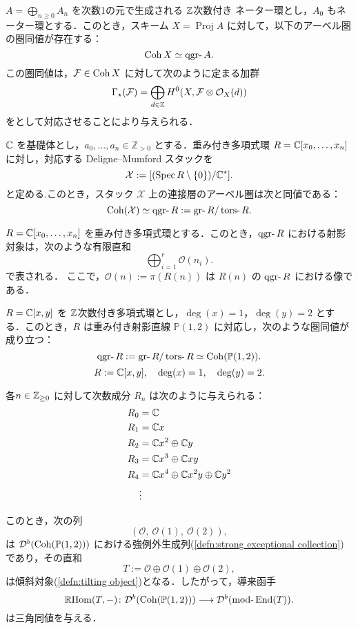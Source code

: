 \begin{thm}
\( A = \bigoplus_{n \ge 0} A_n \) を次数1の元で生成される \({\mathbb Z}\)次数付き ネーター環とし，\( A_0 \) もネーター環とする．このとき，スキーム \( X = \operatorname{Proj} A \) に対して，以下のアーベル圏の圏同値が存在する：
\[
\Coh X \simeq \qgr A.
\]
この圏同値は，\( {\mathcal F} \in \operatorname{\mathrm{Coh}} X \) に対して次のように定まる加群
\[
\Gamma_\star({\mathcal F}) = \bigoplus_{d \in {\mathbb Z}} H^0(X, {\mathcal F} \otimes \mathcal{O}_X(d))
\]
をとして対応させることにより与えられる．
\end{thm}

\begin{prop}\cite{GL87}
${\mathbb C}$ を基礎体とし，$a_0, \dots, a_n \in \mathbb{Z}_{>0}$ とする．重み付き多項式環 $R = {\mathbb C}[x_0, \dots, x_n]$ に対し，対応する Deligne–Mumford スタックを
\[
\mathcal{X} := [(\operatorname{\mathrm{Spec}} R \setminus \{0\}) / {\mathbb C}^*].
\]
と定める.このとき，スタック $\mathcal{X}$ 上の連接層のアーベル圏は次と同値である：
\[
\Coh(\mathcal{X}) \simeq \qgr R := \gr R / \tors R.
\]
\end{prop}



\begin{prop}[\cite{AZ94}]
$R = {\mathbb C}[x_0, \dots, x_n]$ を重み付き多項式環とする．このとき，$\qgr R$ における射影対象は，次のような有限直和
\[
\bigoplus_{i=1}^r \mathcal{O}(n_i).
\]
で表される．
ここで，$\mathcal{O}(n) := \pi(R(n))$ は $R(n)$ の $\qgr R$ における像である．
\end{prop}


\begin{exmp}
$R = {\mathbb C}[x, y]$ を ${\mathbb Z}$次数付き多項式環とし，$\deg(x) = 1$，$\deg(y) = 2$ とする．このとき，$R$ は重み付き射影直線 $\mathbb{P}(1,2)$ に対応し，次のような圏同値が成り立つ：
\[
\qgr R := \gr R / \tors R \simeq \Coh(\mathbb{P}(1,2)).
\]
\[
R := {\mathbb C}[x, y], \quad \deg(x) = 1,\quad \deg(y) = 2.
\]

各\(n \in {\mathbb Z}_{\ge 0}\) に対して次数成分 \(R_n\) は次のように与えられる：
\[
\begin{aligned}
R_0 &= {\mathbb C} \\
R_1 &= {\mathbb C} x \\
R_2 &= {\mathbb C} x^2 \oplus {\mathbb C} y \\
R_3 &= {\mathbb C} x^3 \oplus {\mathbb C} x y \\
R_4 &= {\mathbb C} x^4 \oplus {\mathbb C} x^2 y \oplus {\mathbb C} y^2 \\
&\vdots 
\end{aligned}
\]

このとき，次の列
\[
(\mathcal{O},\ \mathcal{O}(1),\ \mathcal{O}(2)),
\]
は \({\mathcal D}^b(\operatorname{\mathrm{Coh}}(\mathbb{P}(1,2)))\) における強例外生成列(\ref{defn:strong exceptional collection})であり，その直和
\[
T := \mathcal{O} \oplus \mathcal{O}(1) \oplus \mathcal{O}(2),
\]
は傾斜対象(\ref{defn:tilting object})となる．したがって，導来函手
\[
\RHom(T, -) \colon \D^b(\Coh(\mathbb{P}(1,2))) \longrightarrow \D^b(\mod \End(T)).
\]
は三角同値を与える．
\end{exmp}

